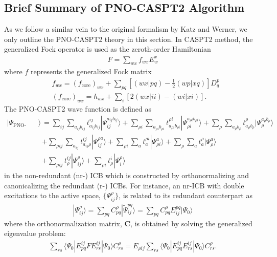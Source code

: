 \documentclass[aip,jcp,amsmath]{revtex4-1}
\begin{document}
\subsection{Brief Summary of PNO-CASPT2 Algorithm}

%
As we follow a similar vein to the original formalism by Katz and Werner, we only outline the PNO-CASPT2 theory in this section.
%
In CASPT2 method, the generalized Fock operator is used as the zeroth-order Hamiltonian
%
\begin{align}
  F=\sum_{wx} f_{wx} E^x_w
\end{align}
%
where $f$ represents the generalized Fock matrix
%
\begin{align}
  &f_{wx} = (f_\text{core})_{wx} + \sum_{pq} \left[(wx|pq)-\frac{1}{2}(wp|xq)\right]D^p_q \\
  &(f_\text{core})_{wx} = h_{wx} + \sum_{i} [2(wx|ii)-(wi|xi)]. 
\end{align}
%
The PNO-CASPT2 wave function is defined as
%
\begin{align}
  |\Psi_\text{PNO-CASPT2}\rangle&=\sum_{ij}\sum_{a_{ij}b_{ij}} t_{a_{ij}b_{ij}}^{ij}|\Psi_{ij}^{a_{ij}b_{ij}}\rangle+\sum_{\rho i}\sum_{a_{\rho i}b_{\rho i}} t_{a_{\rho i}b_{\rho i}}^{\rho i}|\Psi_{{\rho i}}^{a_{\rho i}b_{\rho i}}\rangle+\sum_{\rho}\sum_{a_{\rho}b_{\rho}} t_{a_{\rho}b_{\rho}}^{\rho}|\Psi_{{\rho}}^{a_{\rho}b_{\rho}}\rangle\nonumber \\
  & + \sum_{\rho ij}\sum_{a_{ij}} t_{a_{ij}\rho}^{ij}|\Psi_{ij}^{\rho a}\rangle +\sum_{\rho i}\sum_a t_{a}^{\rho i}|\Psi_{\rho i}^{a}\rangle +\sum_{\rho}\sum_a t_{a}^\rho|\Psi_\rho^a\rangle \nonumber \\
  &+ \sum_{\rho ij} t_{\rho}^{ij}|\Psi_{ij}^\rho\rangle+\sum_{\rho i} t_{\rho}^i|\Psi_{i}^\rho\rangle \label{eq:pno-caspt2}
\end{align}
%
in the non-redundant (nr-) ICB which is constructed by orthonormalizing and canonicalizing the redundant (r-) ICBs.
%
For instance, an nr-ICB with double excitations to the active space, $\{\Psi^{\rho}_{ij}\}$, is related to its redundant counterpart as
%
\begin{align}
  |\Psi_{ij}^{\rho}\rangle=\sum_{pq} C_{pq}^{\rho} |\tilde{\Psi}_{ij}^{pq}\rangle = \sum_{pq} C_{pq}^{\rho} E_{ij}^{pq} |\Psi_0\rangle
\end{align}
%
where the orthonormalization matrix, $\mathbf{C}$, is obtained by solving the generalized eigenvalue problem:
%
\begin{align}
  \sum_{rs}\langle\Psi_0|E_{pq}^{ij}FE_{rs}^{ij}|\Psi_0\rangle C_{rs}^\rho=E_{\rho ij}\sum_{rs}\langle\Psi_0|E_{pq}^{ij}E_{rs}^{ij}|\Psi_0\rangle C_{rs}^\rho.
\end{align}
\end{document}
